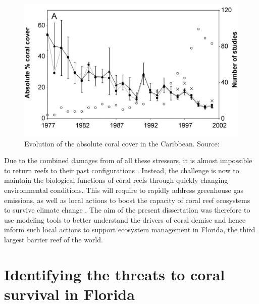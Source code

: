 \begin{figure}
    \centering
    \includegraphics[width=.9\textwidth]{chapters/intro/figures/cover.jpeg}
    \caption{Evolution of the absolute coral cover in the Caribbean. Source: \cite{gardner2003long}}
    \label{intro:cover}
\end{figure}

Due to the combined damages from of all these stressors, it is almost impossible to return reefs to their past configurations \citep{hughes2017coral}. Instead, the challenge is now to maintain the biological functions of coral reefs through quickly changing environmental conditions. This will require to rapidly address greenhouse gas emissions, as well as local actions to boost the capacity of coral reef ecosystems to survive climate change \citep{hughes2003climate,knowlton2008shifting,graham2015predicting}. The aim of the present dissertation was therefore to use modeling tools to better understand the drivers of coral demise and hence inform such local actions to support ecosystem management in Florida, the third largest barrier reef of the world.

\section{Identifying the threats to coral survival in Florida}

